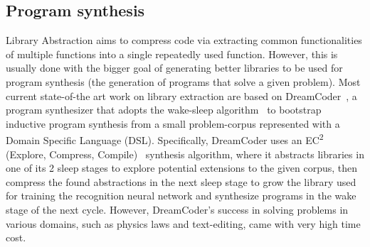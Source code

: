 



\subsection{Program synthesis}
Library Abstraction aims to compress code via extracting common functionalities of multiple functions into a single repeatedly used function. However, this is usually done with the bigger goal of generating better libraries to be used for program synthesis (the generation of programs that solve a given problem). Most current state-of-the art work on library extraction are based on DreamCoder~\cite{ellis2020dreamcoder}, a program synthesizer that adopts the wake-sleep algorithm~\cite{wake-sleep} to bootstrap inductive program synthesis from a small problem-corpus represented with a Domain Specific Language (DSL). Specifically, DreamCoder uses an EC\textsuperscript{2} (Explore, Compress, Compile)~\cite{EC2} synthesis algorithm, where it abstracts libraries in one of its 2 sleep stages to explore potential extensions to the given corpus, then compress the found abstractions in the next sleep stage to grow the library used for training the recognition neural network and synthesize programs in the wake stage of the next cycle. However, DreamCoder's success in solving problems in various domains, such as physics laws and text-editing, came with very high time cost. 


